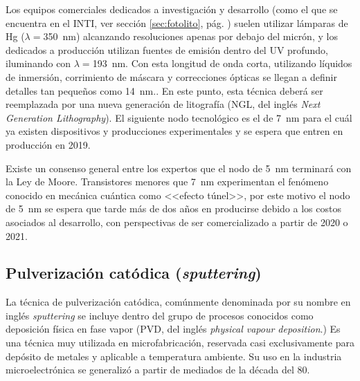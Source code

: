 		Los equipos comerciales dedicados a investigación y desarrollo (como el que se encuentra en el INTI, ver sección \ref{sec:fotolito}, pág. \pageref{sec:fotolito}) suelen utilizar lámparas de Hg ($\lambda=$\SI{350}{\nm}) alcanzando resoluciones apenas por debajo del micrón, y los dedicados a producción utilizan fuentes de emisión dentro del UV profundo, iluminando con $\lambda\!=$\SI{193}{\nm}. Con esta longitud de onda corta, utilizando líquidos de inmersión, corrimiento de máscara y correcciones ópticas se llegan a definir detalles tan pequeños como \SI{14}{\nm}.\cite{moore2006a}. En este punto, esta técnica deberá ser reemplazada por una nueva generación de litografía (NGL, del inglés \textit{Next Generation Lithography}).\cite{Asano2017,Schoot2017,Hasan2017,Naujok2017,Wan2017} El siguiente nodo tecnológico es el de \SI{7}{\nm} para el cuál ya existen dispositivos y producciones experimentales y se espera que entren en producción en 2019.\cite{Clinton2017,Chang2017}

		Existe un consenso general entre los expertos que el nodo de \SI{5}{\nm} terminará con la Ley de Moore. Transistores menores que \SI{7}{\nm} experimentan el fenómeno conocido en mecánica cuántica como <<efecto túnel>>, por este motivo el nodo de \SI{5}{\nm} se espera que tarde más de dos años en producirse debido a los costos asociados al desarrollo, con perspectivas de ser comercializado a partir de 2020 o 2021. \cite{samsungnewsroom,ibm2017}

	\subsection{Pulverización catódica (\textit{sputtering})}
				
		La técnica de pulverización catódica, comúnmente denominada por su nombre en inglés \textit{sputtering} se incluye dentro del grupo de procesos conocidos como deposición física en fase vapor (PVD, del inglés \textit{physical vapour deposition}.) Es una técnica muy utilizada en microfabricación, reservada casi exclusivamente para depósito de metales y aplicable a temperatura ambiente. Su uso en la industria microelectrónica se generalizó a partir de mediados de la década del 80.\cite{Depla2010,Kelly2000}

